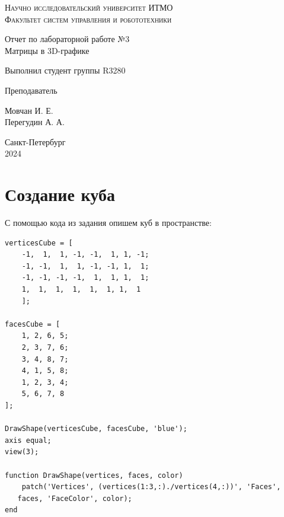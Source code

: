 \documentclass[a4paper,hidelinks,14pt]{extarticle}
\begin{document}
	\begin{titlepage}
		
		\setlength{\parindent}{0ex} %
		
		\begin{center}
			\textsc{
				\vspace{1ex}
				Научно исследовательский университет ИТМО \\
				\vspace{0.5ex}
				Факультет систем управления и робототехники \\
				\vspace{0.5ex}
			}
		\end{center}
		
		\vspace{50mm}
		
		\begin{center}
			Отчет по лабораторной работе №3 \\
			Матрицы в 3D-графике
		\end{center}
		
		\vspace{50mm}
		
		\begin{minipage}{.55\linewidth}
			Выполнил студент группы R3280
			
			\smallskip
			
			Преподаватель
		\end{minipage}
		\hfill
		\begin{minipage}{.4\linewidth}
			\begin{flushright}
				Мовчан И. Е.
				\\
				Перегудин А. А.
			\end{flushright}
		\end{minipage}
		
		\vfill
		\begin{center}
			Санкт-Петербург
			\\
			2024
		\end{center}
		
	\end{titlepage}
	
	\section{Создание куба}
	С помощью кода из задания опишем куб в пространстве:
	\begin{lstlisting}
verticesCube = [
	-1,  1,  1, -1, -1,  1, 1, -1;
	-1, -1,  1,  1, -1, -1, 1,  1;
	-1, -1, -1, -1,  1,  1, 1,  1;
	1,  1,  1,  1,  1,  1, 1,  1
	];

facesCube = [
	1, 2, 6, 5;
	2, 3, 7, 6;
	3, 4, 8, 7;
	4, 1, 5, 8;
	1, 2, 3, 4;
	5, 6, 7, 8
];

DrawShape(verticesCube, facesCube, 'blue');
axis equal;
view(3);

function DrawShape(vertices, faces, color)
	patch('Vertices', (vertices(1:3,:)./vertices(4,:))', 'Faces',
   faces, 'FaceColor', color);
end
	\end{lstlisting}
	
\end{document}
